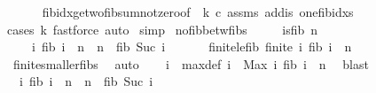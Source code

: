\begin{isabellebody}
\ \ \ \ \isamarkupfalse%
\ fib{\isacharunderscore}{\kern0pt}idx{\isacharunderscore}{\kern0pt}ge{\isacharunderscore}{\kern0pt}two{\isacharunderscore}{\kern0pt}fib{\isacharunderscore}{\kern0pt}sum{\isacharunderscore}{\kern0pt}not{\isacharunderscore}{\kern0pt}zero{\isacharbrackleft}{\kern0pt}of\ {}\ k\ c{\isacharbrackright}{\kern0pt}\ assms\ add{\isacharunderscore}{\kern0pt}is{\isacharunderscore}{\kern0pt}{}\ one{\isacharunderscore}{\kern0pt}fib{\isacharunderscore}{\kern0pt}idxs\ \isamarkupfalse%
{\isacharparenleft}{\kern0pt}cases\ {\isachardoublequoteopen}k{\isacharequal}{\kern0pt}{}{\isachardoublequoteclose}{\isacharcomma}{\kern0pt}\ fastforce{\isacharcomma}{\kern0pt}\ auto{\isacharparenright}{\kern0pt}\isanewline
{}\isamarkupfalse%
\ simp%
\endisatagproof
{\isafoldproof}%
%
\isadelimproof
\isanewline
%
\endisadelimproof
\isanewline
{}\isamarkupfalse%
\ no{\isacharunderscore}{\kern0pt}fib{\isacharunderscore}{\kern0pt}betw{\isacharunderscore}{\kern0pt}fibs{\isacharcolon}{\kern0pt}\ \isanewline
\ \ \ {\isachardoublequoteopen}{\isasymnot}\ is{\isacharunderscore}{\kern0pt}fib\ n{\isachardoublequoteclose}\isanewline
\ \ \ {\isachardoublequoteopen}{\isasymexists}\ i{\isachardot}{\kern0pt}\ fib\ i\ {\isacharless}{\kern0pt}\ n\ {\isasymand}\ n\ {\isacharless}{\kern0pt}\ fib\ {\isacharparenleft}{\kern0pt}Suc\ i{\isacharparenright}{\kern0pt}{\isachardoublequoteclose}\isanewline
%
\isadelimproof
%
\endisadelimproof
%
\isatagproof
{}\isamarkupfalse%
\ {\isacharminus}{\kern0pt}\ \isanewline
\ \ \isamarkupfalse%
\ finite{\isacharunderscore}{\kern0pt}le{\isacharunderscore}{\kern0pt}fib{\isacharcolon}{\kern0pt}\ {\isachardoublequoteopen}finite\ {\isacharbraceleft}{\kern0pt}i{\isachardot}{\kern0pt}\ fib\ i\ {\isacharless}{\kern0pt}\ n{\isacharbraceright}{\kern0pt}{\isachardoublequoteclose}\ \isamarkupfalse%
\ finite{\isacharunderscore}{\kern0pt}smaller{\isacharunderscore}{\kern0pt}fibs\ \isamarkupfalse%
\ auto\isanewline
\ \ \isamarkupfalse%
\ i\ \ max{\isacharunderscore}{\kern0pt}def{\isacharcolon}{\kern0pt}\ {\isachardoublequoteopen}i\ {\isacharequal}{\kern0pt}\ Max\ {\isacharbraceleft}{\kern0pt}i{\isachardot}{\kern0pt}\ fib\ i\ {\isacharless}{\kern0pt}\ n{\isacharbraceright}{\kern0pt}{\isachardoublequoteclose}\ \isamarkupfalse%
\ blast\isanewline
\ \ \isamarkupfalse%
\ {\isachardoublequoteopen}{\isasymexists}\ i{\isachardot}{\kern0pt}\ fib\ i\ {\isacharless}{\kern0pt}\ n\ {\isasymand}\ n\ {\isacharless}{\kern0pt}\ fib\ {\isacharparenleft}{\kern0pt}Suc\ i{\isacharparenright}{\kern0pt}{\isachardoublequoteclose}\isanewline

\end{isabellebody}
